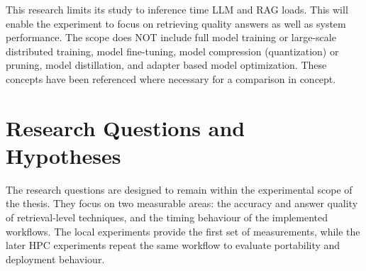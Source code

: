     This research limits its study to inference time \ac{LLM} and \ac{RAG} loads. This will enable the experiment to focus on retrieving quality answers as well as system performance. The scope does NOT include full model training or large-scale distributed training, model fine-tuning, model compression (quantization) or pruning, model distillation, and adapter based model optimization. These concepts have been referenced where necessary for a comparison in concept.

\section{Research Questions and Hypotheses}

The research questions are designed to remain within the experimental scope of the thesis. They focus on two measurable areas: the accuracy and answer quality of retrieval-level techniques, and the timing behaviour of the implemented workflows. The local experiments provide the first set of measurements, while the later \ac{HPC} experiments repeat the same workflow to evaluate portability and deployment behaviour.

